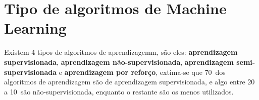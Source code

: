 \section{Tipo de algoritmos de Machine Learning}
\label{sec:ml-types}

Existem 4 tipos de algoritmos de aprendizagemm, são eles: \textbf{aprendizagem supervisionada}, \textbf{aprendizagem não-supervisionada},
\textbf{aprendizagem semi-supervisionada} e \textbf{aprendizagem por reforço}, extima-se que 70\ dos algoritmos de aprendizagem são de 
aprendizagem supervisionada, e algo entre 20 a 10\ são não-supervisionada, enquanto o restante são os menos utilizados.



